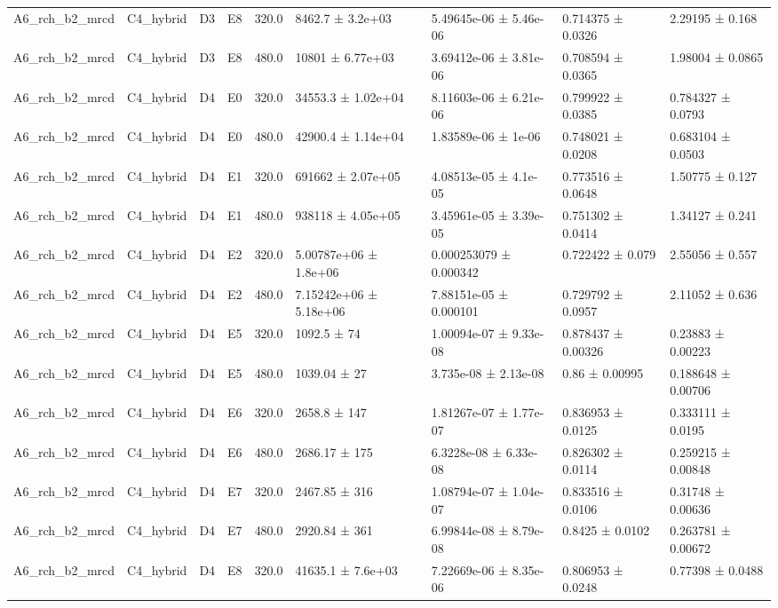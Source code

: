 \begin{table}
\begin{tabular}{lllllllll}
A6\_rch\_b2\_mrcd & C4\_hybrid & D3 & E8 & 320.0 & 8462.7 ± 3.2e+03 & 5.49645e-06 ± 5.46e-06 & 0.714375 ± 0.0326 & 2.29195 ± 0.168 \\
A6\_rch\_b2\_mrcd & C4\_hybrid & D3 & E8 & 480.0 & 10801 ± 6.77e+03 & 3.69412e-06 ± 3.81e-06 & 0.708594 ± 0.0365 & 1.98004 ± 0.0865 \\
A6\_rch\_b2\_mrcd & C4\_hybrid & D4 & E0 & 320.0 & 34553.3 ± 1.02e+04 & 8.11603e-06 ± 6.21e-06 & 0.799922 ± 0.0385 & 0.784327 ± 0.0793 \\
A6\_rch\_b2\_mrcd & C4\_hybrid & D4 & E0 & 480.0 & 42900.4 ± 1.14e+04 & 1.83589e-06 ± 1e-06 & 0.748021 ± 0.0208 & 0.683104 ± 0.0503 \\
A6\_rch\_b2\_mrcd & C4\_hybrid & D4 & E1 & 320.0 & 691662 ± 2.07e+05 & 4.08513e-05 ± 4.1e-05 & 0.773516 ± 0.0648 & 1.50775 ± 0.127 \\
A6\_rch\_b2\_mrcd & C4\_hybrid & D4 & E1 & 480.0 & 938118 ± 4.05e+05 & 3.45961e-05 ± 3.39e-05 & 0.751302 ± 0.0414 & 1.34127 ± 0.241 \\
A6\_rch\_b2\_mrcd & C4\_hybrid & D4 & E2 & 320.0 & 5.00787e+06 ± 1.8e+06 & 0.000253079 ± 0.000342 & 0.722422 ± 0.079 & 2.55056 ± 0.557 \\
A6\_rch\_b2\_mrcd & C4\_hybrid & D4 & E2 & 480.0 & 7.15242e+06 ± 5.18e+06 & 7.88151e-05 ± 0.000101 & 0.729792 ± 0.0957 & 2.11052 ± 0.636 \\
A6\_rch\_b2\_mrcd & C4\_hybrid & D4 & E5 & 320.0 & 1092.5 ± 74 & 1.00094e-07 ± 9.33e-08 & 0.878437 ± 0.00326 & 0.23883 ± 0.00223 \\
A6\_rch\_b2\_mrcd & C4\_hybrid & D4 & E5 & 480.0 & 1039.04 ± 27 & 3.735e-08 ± 2.13e-08 & 0.86 ± 0.00995 & 0.188648 ± 0.00706 \\
A6\_rch\_b2\_mrcd & C4\_hybrid & D4 & E6 & 320.0 & 2658.8 ± 147 & 1.81267e-07 ± 1.77e-07 & 0.836953 ± 0.0125 & 0.333111 ± 0.0195 \\
A6\_rch\_b2\_mrcd & C4\_hybrid & D4 & E6 & 480.0 & 2686.17 ± 175 & 6.3228e-08 ± 6.33e-08 & 0.826302 ± 0.0114 & 0.259215 ± 0.00848 \\
A6\_rch\_b2\_mrcd & C4\_hybrid & D4 & E7 & 320.0 & 2467.85 ± 316 & 1.08794e-07 ± 1.04e-07 & 0.833516 ± 0.0106 & 0.31748 ± 0.00636 \\
A6\_rch\_b2\_mrcd & C4\_hybrid & D4 & E7 & 480.0 & 2920.84 ± 361 & 6.99844e-08 ± 8.79e-08 & 0.8425 ± 0.0102 & 0.263781 ± 0.00672 \\
A6\_rch\_b2\_mrcd & C4\_hybrid & D4 & E8 & 320.0 & 41635.1 ± 7.6e+03 & 7.22669e-06 ± 8.35e-06 & 0.806953 ± 0.0248 & 0.77398 ± 0.0488 \\

\end{tabular}
\end{table}
